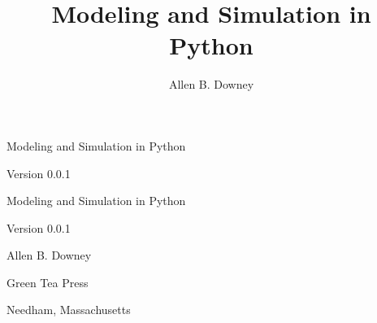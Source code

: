 \documentclass[12pt]{book}
\title{Modeling and Simulation in Python}
\author{Allen B. Downey}
\newcommand{\thetitle}{Modeling and Simulation in Python}
\newcommand{\theauthors}{Allen B. Downey}
\newcommand{\theversion}{0.0.1}
\theoremstyle{exercise}
\newif\ifplastex
\begin{document}
\frontmatter

\ifplastex

\maketitle

\else

\begin{latexonly}

\thispagestyle{empty}

\begin{flushright}
\vspace*{2.0in}

\begin{spacing}{3}
{\huge \thetitle}
\end{spacing}

\vspace{0.25in}

Version \theversion

\vfill

\end{flushright}


\newpage
\newpage

\pagebreak
\thispagestyle{empty}

\begin{flushright}
\vspace*{2.0in}

\begin{spacing}{3}
{\huge \thetitle}
\end{spacing}

\vspace{0.25in}

Version \theversion

\vspace{1in}


{\Large
\theauthors \\
}


\vspace{0.5in}

{\Large Green Tea Press}

{\small Needham, Massachusetts}

\vfill


\end{flushright}
\end{latexonly}
\end{document}

